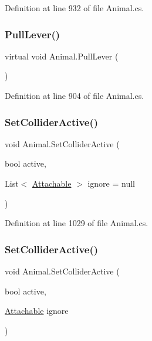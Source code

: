 Definition at line 932 of file Animal.\+cs.

\mbox{\label{class_animal_a300d7a15f30a1e57ff1cccc86555b18a}} 
\subsubsection{\texorpdfstring{Pull\+Lever()}{PullLever()}}
{\footnotesize\ttfamily virtual void Animal.\+Pull\+Lever (\begin{DoxyParamCaption}{ }\end{DoxyParamCaption})\hspace{0.3cm}{\ttfamily [virtual]}}



Definition at line 904 of file Animal.\+cs.

\mbox{\label{class_animal_a7b30268c3ad4feb7b84107e195eaac28}} 
\subsubsection{\texorpdfstring{Set\+Collider\+Active()}{SetColliderActive()}\hspace{0.1cm}{\footnotesize\ttfamily [1/2]}}
{\footnotesize\ttfamily void Animal.\+Set\+Collider\+Active (\begin{DoxyParamCaption}\item[{bool}]{active,  }\item[{List$<$ \mbox{\hyperlink{class_attachable}{Attachable}} $>$}]{ignore = {\ttfamily null} }\end{DoxyParamCaption})}



Definition at line 1029 of file Animal.\+cs.

\mbox{\label{class_animal_a2f02116126d2fddd5938a5f3b9b163d1}} 
\subsubsection{\texorpdfstring{Set\+Collider\+Active()}{SetColliderActive()}\hspace{0.1cm}{\footnotesize\ttfamily [2/2]}}
{\footnotesize\ttfamily void Animal.\+Set\+Collider\+Active (\begin{DoxyParamCaption}\item[{bool}]{active,  }\item[{\mbox{\hyperlink{class_attachable}{Attachable}}}]{ignore }\end{DoxyParamCaption})}



